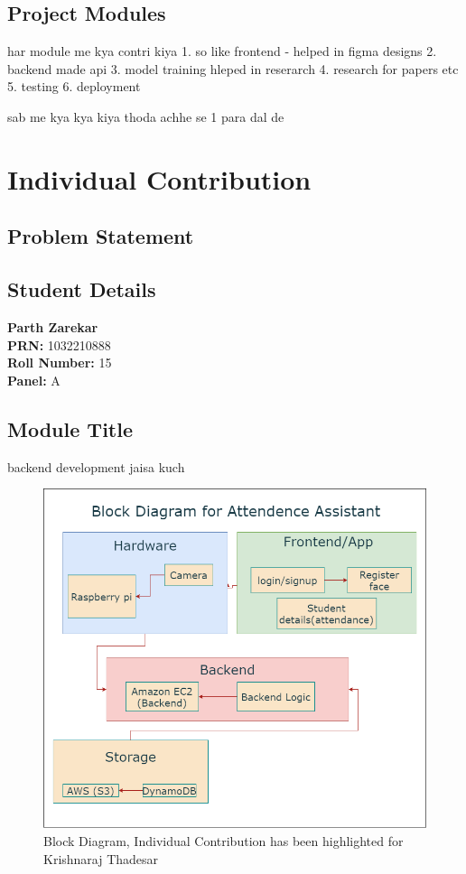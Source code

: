 \documentclass[openany]{report}
\begin{document}
\section{Project Modules}
har module me kya contri kiya
1. so like frontend - helped in figma designs
2. backend made api
3. model training hleped in reserarch
4. research for papers etc
5. testing
6. deployment

sab me kya kya kiya thoda achhe se 1 para dal de

\chapter{Individual Contribution}
\section{Problem Statement}
\section{Student Details}
\textbf{Parth Zarekar} \\
\textbf{PRN:} 1032210888 \\
\textbf{Roll Number:} 15 \\
\textbf{Panel:} A \\
\section{Module Title}
backend development  jaisa kuch
\begin{figure}[H]
    \centering
    \includegraphics[width=.95\textwidth]{../imgs/block diagram.png}
    \caption{Block Diagram, Individual Contribution has been highlighted for Krishnaraj Thadesar}
    \label{fig:block_diagram}
\end{figure}
\end{document}
